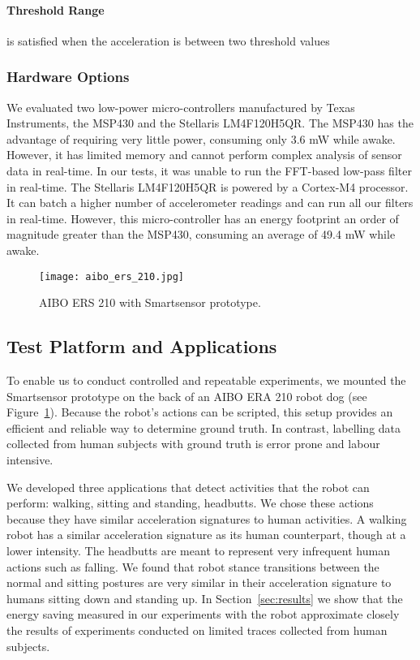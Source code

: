 \paragraph{Threshold Range} is satisfied when the acceleration is between two threshold values


\subsubsection{Hardware Options}

We evaluated two low-power micro-controllers manufactured by Texas
Instruments, the MSP430 and the Stellaris LM4F120H5QR.  The MSP430 has
the advantage of requiring very little power, consuming only 3.6 mW
while awake. However, it has limited memory and cannot perform complex
analysis of sensor data in real-time. In our tests, it was unable to
run the FFT-based low-pass filter in real-time.  The Stellaris LM4F120H5QR is powered
by a Cortex-M4 processor. It can batch a higher number of accelerometer
readings and can run all our filters in real-time.  However, this
micro-controller has an energy footprint an order of magnitude greater
than the MSP430, consuming an average of 49.4 mW while awake.

\begin{figure}[t]
	\texttt{[image: aibo\_ers\_210.jpg]}
	\caption{AIBO ERS 210 with Smartsensor prototype.}
	\label{fig:aibo}
\end{figure}

\subsection{Test Platform and Applications}
\label{sec:applications}

To enable us to conduct controlled and repeatable experiments, we
mounted the Smartsensor prototype on the back of an AIBO ERA 210 robot
dog (see Figure~\ref{fig:aibo}). Because the robot's actions can be
scripted, this setup provides an efficient and reliable way to
determine ground truth. In contrast, labelling data collected from
human subjects with ground truth is error prone and labour intensive.

We developed three applications that detect activities that the robot
can perform: walking, sitting and standing, headbutts. We chose these
actions because they have similar acceleration signatures to human
activities. A walking robot has a similar acceleration signature as
its human counterpart, though at a lower intensity. The headbutts are
meant to represent very infrequent human actions such as falling. We
found that robot stance transitions between the normal and sitting
postures are very similar in their acceleration signature to humans
sitting down and standing up. In Section~\ref{sec:results} we show
that the energy saving measured in our experiments with the robot
approximate closely the results of experiments conducted on limited
traces collected from human subjects.

